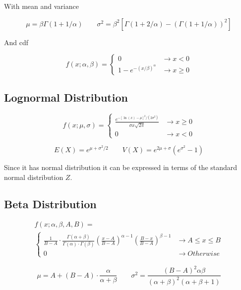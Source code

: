     With mean and variance

        \[
            \mu = \beta \Gamma ( 1 + 1/\alpha ) \qquad \sigma^2 = \beta^2 \left[ \Gamma(1 + 2/\alpha) - {\left( \Gamma(1 +
            1/\alpha) \right)}^2 \right]
        \]

    And cdf

        \[
            f(x; \alpha, \beta) = 
            \begin{cases}
                0 &\to x < 0\\
                1 - e^{-(x/\beta)^\alpha} &\to x \ge 0
            \end{cases}
        \]

    \subsection{Lognormal Distribution}
        \[
            f(x; \mu, \sigma) = 
            \begin{cases}
                \frac{e^{-[\ln(x) - \mu]^2/(2\sigma^2)} }{\sigma x \sqrt{2 \pi} } &\to x \ge 0\\
                0 &\to x < 0
            \end{cases}
        \]

        \[
            E(X) = e^{\mu + \sigma^2 / 2} \qquad V(X) = e^{2\mu + \sigma} \left( e^{\sigma^2} - 1\right)
        \]

    Since it has normal distribution it can be expressed in terms of the standard normal distribution $Z$.

    \subsection{Beta Distribution}
        \[
            \begin{aligned}
                f(x; \alpha, \beta, A, B) =\\
                \begin{cases}
                    \frac{1}{B-A} \cdot \frac{\Gamma(\alpha + \beta)}{\Gamma(\alpha) \cdot \Gamma(\beta)}
                    {\left( \frac{x - A}{B - A} \right)}^{\alpha - 1} {\left(\frac{B - x}{B - A}\right)}^{\beta - 1}
                    &\to A \le x \le B\\
                    0 &\to Otherwise
                \end{cases}
            \end{aligned}
        \]

        \[
            \mu = A + (B - A) \cdot \frac{\alpha}{\alpha + \beta} \qquad \sigma^2 = \frac{ {(B - A)}^2 \alpha
        \beta}{ {(\alpha+\beta)}^2 (\alpha + \beta + 1)}
        \]

